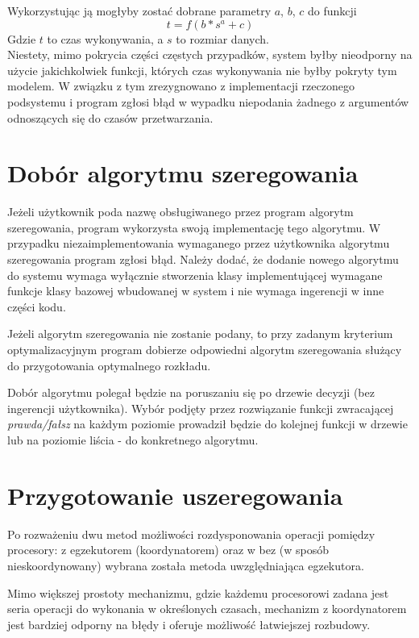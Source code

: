 \documentclass[brudnopis]{xmgr}
\begin{document}
Wykorzystując ją mogłyby zostać dobrane parametry $a$, $b$, $c$ do funkcji
$$t = f(b * s^a + c)$$
Gdzie $t$ to czas wykonywania, a $s$ to rozmiar danych.\\
Niestety, mimo pokrycia części częstych przypadków, system byłby nieodporny na użycie jakichkolwiek funkcji, których czas wykonywania nie byłby pokryty tym modelem.
W związku z tym zrezygnowano z implementacji rzeczonego podsystemu i program zgłosi błąd w wypadku niepodania żadnego z argumentów odnoszących się do czasów przetwarzania.
\medskip


\section{Dobór algorytmu szeregowania}

Jeżeli użytkownik poda nazwę obsługiwanego przez program algorytm szeregowania, program wykorzysta swoją implementację tego algorytmu.
W przypadku niezaimplementowania wymaganego przez użytkownika algorytmu szeregowania program zgłosi błąd.
Należy dodać, że dodanie nowego algorytmu do systemu wymaga wyłącznie stworzenia klasy implementującej wymagane funkcje klasy bazowej wbudowanej w system i nie wymaga ingerencji w inne części kodu.
\medskip

Jeżeli algorytm szeregowania nie zostanie podany, to przy zadanym kryterium optymalizacyjnym program dobierze odpowiedni algorytm szeregowania służący do przygotowania optymalnego rozkładu.
\medskip

Dobór algorytmu polegał będzie na poruszaniu się po drzewie decyzji (bez ingerencji użytkownika).
Wybór podjęty przez rozwiązanie funkcji zwracającej \emph{prawda/fałsz} na każdym poziomie prowadził będzie do kolejnej funkcji w drzewie lub na poziomie liścia - do konkretnego algorytmu.


\section{Przygotowanie uszeregowania}

Po rozważeniu dwu metod możliwości rozdysponowania operacji pomiędzy procesory: z egzekutorem (koordynatorem) oraz w bez (w sposób nieskoordynowany) wybrana została metoda uwzględniająca egzekutora.
\medskip

Mimo większej prostoty mechanizmu, gdzie każdemu procesorowi zadana jest seria operacji do wykonania w określonych czasach, mechanizm z koordynatorem jest bardziej odporny na błędy i oferuje możliwość łatwiejszej rozbudowy.
\end{document}
